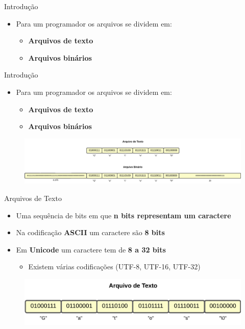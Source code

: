 \begin{frame}{Introdução}
\begin{itemize}
    \item Para um programador os arquivos se dividem em:
    \begin{itemize}
        \item \textbf{Arquivos de texto}
        \item \textbf{Arquivos binários}
    \end{itemize}
\end{itemize}
    
\end{frame}


\begin{frame}{Introdução}
\begin{itemize}
    \item Para um programador os arquivos se dividem em:
    \begin{itemize}
        \item \textbf{Arquivos de texto}
        \item \textbf{Arquivos binários}
    \end{itemize}
\end{itemize}
\begin{figure}
    \centering
    \includegraphics[width=1\linewidth]{figuras/arqTyp.png}
\end{figure}
\end{frame}




\begin{frame}{Arquivos de Texto}
\begin{itemize}
    \item Uma sequência de bits em que \textbf{n bits representam um caractere}
    \item Na codificação \textbf{ASCII} um caractere são \textbf{8 bits}
    \item Em \textbf{Unicode} um caractere tem de \textbf{8 a 32 bits}
    \begin{itemize}
        \item Existem várias codificações (UTF-8, UTF-16, UTF-32)\\
    \end{itemize}
\end{itemize}
\begin{figure}
    \centering
    \includegraphics[width=1\linewidth]{figuras/textArq.png}
\end{figure}
\end{frame}


